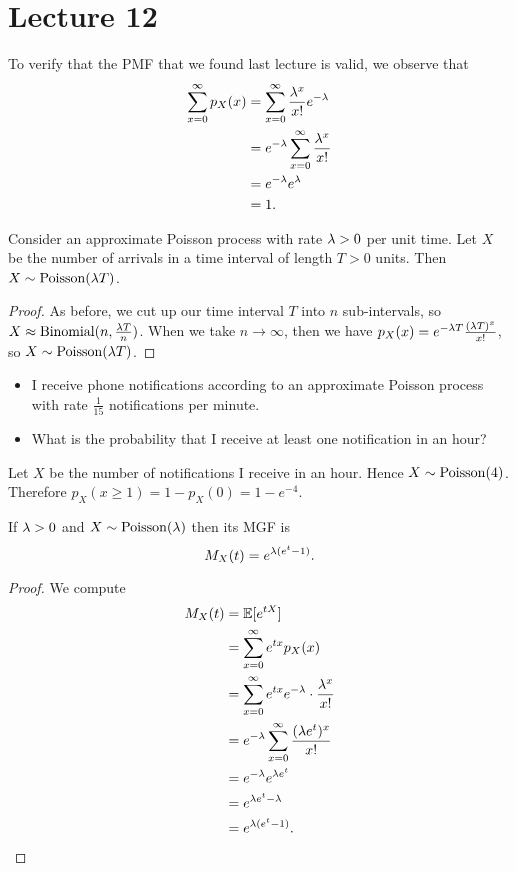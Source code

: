 \documentclass[class=article, crop=false]{standalone}
\begin{document}
  \section{Lecture 12}
  To verify that the PMF that we found last lecture is valid, we observe that
  \begin{align*}
    \sum_{x=0}^{\infty} p_X(x) &= \sum_{x=0}^{\infty} \frac{\lambda^x}{x!}e^{-\lambda} \\
                               &= e^{-\lambda} \sum_{x=0}^{\infty} \frac{\lambda^x}{x!} \\
                               &= e^{-\lambda}e^{\lambda} \\
                               &= 1.
  \end{align*}
  \begin{theorem}{}
    Consider an approximate Poisson process with rate $\lambda > 0$ per unit time. Let $X$ be the number of arrivals in a time interval of length $T > 0$ units. Then $X\sim \operatorname{Poisson}(\lambda T)$.
    \begin{proof}
      As before, we cut up our time interval $T$ into $n$ sub-intervals, so $X\approx \operatorname{Binomial}(n, \frac{\lambda T}{n})$. When we take $n\to\infty$, then we have $p_X(x) = e^{-\lambda T} \frac{(\lambda T)^x}{x!}$, so $X\sim \operatorname{Poisson}(\lambda T)$.
    \end{proof}
  \end{theorem}
  \begin{example}{}
    \begin{itemize}
      \item I receive phone notifications according to an approximate Poisson process with rate $\frac{1}{15}$ notifications per minute.
      \item What is the probability that I receive at least one notification in an hour?
    \end{itemize}
    Let $X$ be the number of notifications I receive in an hour. Hence $X\sim \operatorname{Poisson}(4)$. Therefore $p_X(x \geq 1) = 1 - p_X(0) = 1 - e^{-4}$.
  \end{example}
  \begin{theorem}{}
    If $\lambda > 0$ and $X\sim \operatorname{Poisson}(\lambda)$ then its MGF is
    \[
      M_X(t) = e^{\lambda(e^t - 1)}.
    \]
    \begin{proof}
      We compute
      \begin{align*}
        M_X(t) &= \mathbb{E}[e^{tX}] \\
               &= \sum_{x=0}^{\infty} e^{tx}p_X(x) \\
               &= \sum_{x=0}^{\infty} e^{tx} e^{-\lambda}\cdot \frac{\lambda^x}{x!} \\
               &= e^{-\lambda}\sum_{x=0}^{\infty} \frac{(\lambda e^t)^x}{x!} \\
               &= e^{-\lambda}e^{\lambda e^t} \\
               &= e^{\lambda e^t - \lambda} \\
               &= e^{\lambda(e^t - 1)}.
      \end{align*}
    \end{proof}
  \end{theorem}
\end{document}
